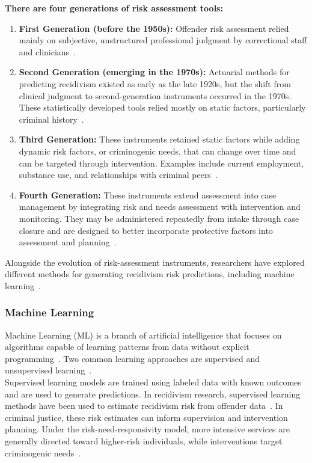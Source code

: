 \documentclass[12pt]{article}
\begin{document}
\textbf{There are four generations of risk assessment tools:}
\begin{enumerate}
 \item \textbf{First Generation (before the 1950s):} Offender risk assessment relied mainly on subjective, unstructured professional judgment by correctional staff and clinicians~\cite{duwe2017out,bonta2007risk,ozkan2017predicting}.
 \item \textbf{Second Generation (emerging in the 1970s):} Actuarial methods for predicting recidivism existed as early as the late 1920s, but the shift from clinical judgment to second-generation instruments occurred in the 1970s. These statistically developed tools relied mostly on static factors, particularly criminal history~\cite{duwe2017out,bonta2007risk}.
 \item \textbf{Third Generation:} These instruments retained static factors while adding dynamic risk factors, or criminogenic needs, that can change over time and can be targeted through intervention. Examples include current employment, substance use, and relationships with criminal peers~\cite{duwe2017out,bonta2007risk}.
 \item \textbf{Fourth Generation:} These instruments extend assessment into case management by integrating risk and needs assessment with intervention and monitoring. They may be administered repeatedly from intake through case closure and are designed to better incorporate protective factors into assessment and planning~\cite{duwe2017out,bonta2007risk}.
\end{enumerate}

Alongside the evolution of risk-assessment instruments, researchers have explored different methods for generating recidivism risk predictions, including machine learning~\cite{duwe2017out}.\@

\subsubsection{Machine Learning}
\tabto{2em} Machine Learning (ML) is a branch of artificial intelligence that focuses on algorithms capable of learning patterns from data without explicit programming~\cite{duwe2017out}. Two common learning approaches are supervised and unsupervised learning~\cite{duwe2017out}.\\

Supervised learning models are trained using labeled data with known outcomes and are used to generate predictions. In recidivism research, supervised learning methods have been used to estimate recidivism risk from offender data~\cite{duwe2017out}. In criminal justice, these risk estimates can inform supervision and intervention planning. Under the risk-need-responsivity model, more intensive services are generally directed toward higher-risk individuals, while interventions target criminogenic needs~\cite{bonta2007risk,duwe2017out}.\\
\end{document}
